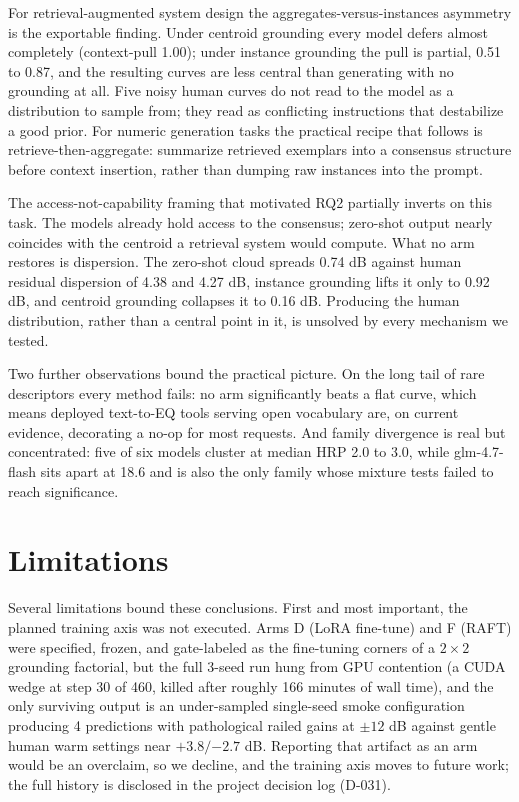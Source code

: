 \documentclass[11pt]{article}
\begin{document}
For retrieval-augmented system design the aggregates-versus-instances asymmetry is the exportable finding. Under centroid grounding every model defers almost completely (context-pull 1.00); under instance grounding the pull is partial, 0.51 to 0.87, and the resulting curves are less central than generating with no grounding at all. Five noisy human curves do not read to the model as a distribution to sample from; they read as conflicting instructions that destabilize a good prior. For numeric generation tasks the practical recipe that follows is retrieve-then-aggregate: summarize retrieved exemplars into a consensus structure before context insertion, rather than dumping raw instances into the prompt.

The access-not-capability framing that motivated RQ2 partially inverts on this task. The models already hold access to the consensus; zero-shot output nearly coincides with the centroid a retrieval system would compute. What no arm restores is dispersion. The zero-shot cloud spreads 0.74 dB against human residual dispersion of 4.38 and 4.27 dB, instance grounding lifts it only to 0.92 dB, and centroid grounding collapses it to 0.16 dB. Producing the human distribution, rather than a central point in it, is unsolved by every mechanism we tested.

Two further observations bound the practical picture. On the long tail of rare descriptors every method fails: no arm significantly beats a flat curve, which means deployed text-to-EQ tools serving open vocabulary are, on current evidence, decorating a no-op for most requests. And family divergence is real but concentrated: five of six models cluster at median HRP 2.0 to 3.0, while glm-4.7-flash sits apart at 18.6 and is also the only family whose mixture tests failed to reach significance.

\section{Limitations}

Several limitations bound these conclusions. First and most important, the planned training axis was not executed. Arms D (LoRA fine-tune) and F (RAFT) were specified, frozen, and gate-labeled as the fine-tuning corners of a $2\times2$ grounding factorial, but the full 3-seed run hung from GPU contention (a CUDA wedge at step 30 of 460, killed after roughly 166 minutes of wall time), and the only surviving output is an under-sampled single-seed smoke configuration producing 4 predictions with pathological railed gains at $\pm 12$ dB against gentle human warm settings near $+3.8/{-2.7}$ dB. Reporting that artifact as an arm would be an overclaim, so we decline, and the training axis moves to future work; the full history is disclosed in the project decision log (D-031).
\end{document}
